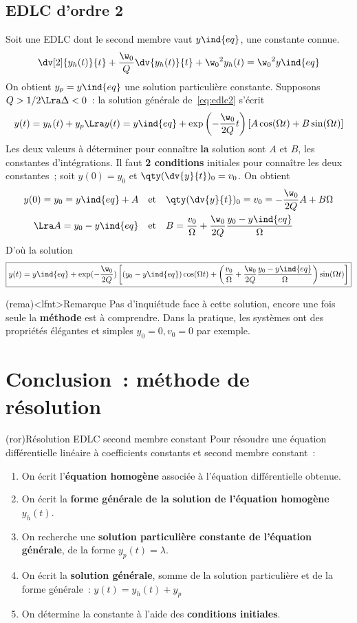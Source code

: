 \documentclass[a4paper, 11pt, garamond]{book}
\begin{document}
\subsection{EDLC d'ordre 2}
Soit une EDLC dont le second membre vaut $y\ind{eq}$, une constante connue.
\begin{equation}
	\dv[2]{y_h(t)}{t} + \frac{\w_0}{Q}\dv{y_h(t)}{t} + \w_0{}^{2} y_h(t) =
	\w_0{}^{2}y\ind{eq}
	\label{eq:edlc2}
\end{equation}
On obtient $y_p = y\ind{eq}$ une solution particulière constante. Supposons
$Q>1/2 \Lra
	\Delta<0$~: la solution générale de~\eqref{eq:edlc2} s'écrit
\[
	y(t) = y_h(t) + y_p
	\Lra
	y(t) = y\ind{eq} + \exp\left( -\frac{\w_0}{2Q}t \right)
	\left[A\cos(\Omega t) + B\sin(\Omega t)\right]
\]
Les deux valeurs à déterminer pour connaître \textbf{la} solution sont $A$ et
$B$, les constantes d'intégrations. Il faut \textbf{2 conditions} initiales pour
connaître les deux constantes~; soit $y(0) = y_0$ et $\qty(\dv{y}{t})_0 = v_0$.
On obtient
\begin{align*}
	y(0) = y_0 = y\ind{eq} + A
	\quad & \text{et} \quad
	\qty(\dv{y}{t})_0 = v_0 = -\frac{\w_0}{2Q}A + B\Omega
	\\\Lra
	A = y_0 - y\ind{eq}
	\quad & \text{et} \quad
	B = \frac{v_0}{\Omega} + \frac{\w_0}{2Q}\frac{y_0-y\ind{eq}}{\Omega}
\end{align*}
D'où la solution
\[
	\boxed{
		y(t) = y\ind{eq} + \exp(-\frac{\w_0}{2Q})
		\left[
			(y_0-y\ind{eq})\cos(\Omega t) +
			\left(
			\frac{v_0}{\Omega} + \frac{\w_0}{2Q}\frac{y_0-y\ind{eq}}{\Omega}
			\right)
			\sin(\Omega t)
			\right]
	}
\]
\begin{tcn}(rema)<lfnt>{Remarque}
	Pas d'inquiétude face à cette solution, encore une fois seule la
	\textbf{méthode} est à comprendre. Dans la pratique, les systèmes ont des
	propriétés élégantes et simples $y_0 = 0, v_0 = 0$ par exemple.
\end{tcn}

\section{Conclusion~: méthode de résolution}
\begin{tcn}(ror){Résolution EDLC second membre constant}
	Pour résoudre une équation différentielle linéaire à
	coefficients constants et second membre constant~:
	\begin{enumerate}[label=\sqenumi]
		\item On écrit l'\textbf{équation homogène} associée à
		      l'équation différentielle obtenue.
		\item On écrit la \textbf{forme générale de la solution de
			      l'équation homogène} $y_h(t)$.
		\item On recherche une \textbf{solution particulière constante de l'équation
			      générale}, de la forme $y_p(t) = \lambda$.
		\item On écrit la \textbf{solution générale}, somme de la
		      solution particulière et de la forme générale~: $y(t) = y_h(t) + y_p$
		\item On détermine la constante à l'aide des \textbf{conditions initiales}.
	\end{enumerate}
\end{tcn}
\end{document}
